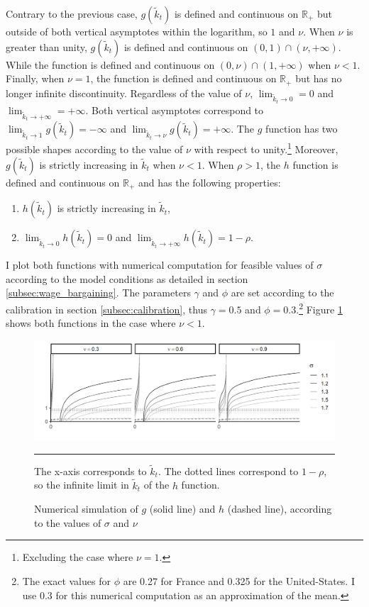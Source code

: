 Contrary to the previous case, $g(\tilde{k}_t)$ is defined and continuous on $\mathbb{R}_+$ but outside of both vertical asymptotes within the logarithm, so $1$ and $\nu$. When $\nu$ is greater than unity, $g(\tilde{k}_t)$ is defined and continuous on $(0, 1) \cap (\nu, +\infty)$. While the function is defined and continuous on $(0, \nu) \cap (1, +\infty)$ when $\nu < 1$. Finally, when $\nu = 1$, the function is defined and continuous on $\mathbb{R}_+$ but has no longer infinite discontinuity. Regardless of the value of $\nu$, $\lim_{\tilde{k}_t\to 0} = 0$ and $\lim_{\tilde{k}_t\to +\infty} = +\infty$. Both vertical asymptotes correspond to $\lim_{\tilde{k}_t\to 1} g(\tilde{k}_t) = -\infty$ and $\lim_{\tilde{k}_t\to \nu} g(\tilde{k}_t) = +\infty$. The $g$ function has two possible shapes according to the value of $\nu$ with respect to unity.\footnote{Excluding the case where $\nu=1$.} Moreover, $g(\tilde{k}_t)$ is strictly increasing in $\tilde{k}_t$ when $\nu < 1$. When $\rho > 1$, the $h$ function is defined and continuous on $\mathbb{R}_+$ and has the following properties:
	\begin{enumerate}
		\item $h(\tilde{k}_t)$ is strictly increasing in $\tilde{k}_t$,
		\item $\lim_{\tilde{k}_t\to 0} h(\tilde{k}_t) = 0$ and $\lim_{\tilde{k}_t\to +\infty} h(\tilde{k}_t) = 1-\rho$.
	\end{enumerate}
I plot both functions with numerical computation for feasible values of $\sigma$ according to the model conditions as detailed in section \ref{subsec:wage_bargaining}. The parameters $\gamma$ and $\phi$ are set according to the calibration in section \ref{subsec:calibration}, thus $\gamma = 0.5$ and $\phi = 0.3$.\footnote{The exact values for $\phi$ are 0.27 for France and 0.325 for the United-States. I use 0.3 for this numerical computation as an approximation of the mean.} Figure \ref{fig:gh2} shows both functions in the case where $\nu < 1$.
	\begin{figure}[tb]
		\centering
		\includegraphics[width = 1\linewidth]{../result/appendix_A/uniqueness/gd_all.png}
		\caption{Numerical simulation of $g$ (solid line) and $h$ (dashed line), according to the values of $\sigma$ and $\nu$}
		\label{fig:gh2}
		\vspace{.5ex}
		\hrule
		\vspace{-4ex}
		\justify\singlespacing\footnotesize The x-axis corresponds to $\tilde{k}_t$. The dotted lines correspond to $1-\rho$, so the infinite limit in $\tilde{k}_t$ of the $h$ function.
	\end{figure}
